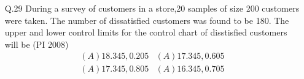 \documentclass[journal,12pt,onecolumn]{IEEEtran}
\theoremstyle{remark}
\begin{document}
\begin{enumerate}
    \hfill{(PI 2008)}
    \begin{multicols}{4}
    \begin{enumerate}[label=(\Alph*)]
        \item Rs. $1.00$ lakh
        \item Rs. $0.50$ lakh
        \item Rs. $0.25$ lakh
        \item Rs. $0.125$ lakh
    \end{enumerate}
\end{multicols}
\vspace{1cm}
 \item[\textnormal{Q.29}]  During a survey of customers in a store,20 samples of size 200 customers were taken. The number of dissatisfied customers was found to be 180. The upper and lower control limits for the control chart of disstisfied customers will be 
    \hfill{(PI 2008)}\\
\[ \begin{matrix}
       { (A) 18.345,0.205} & { (A) 17.345,0.605} \\
       { (A) 17.345,0.805} & { (A) 16.345,0.705}
    \end{matrix}  \]
   
\vspace{1cm}


\end{enumerate}
\end{document}
